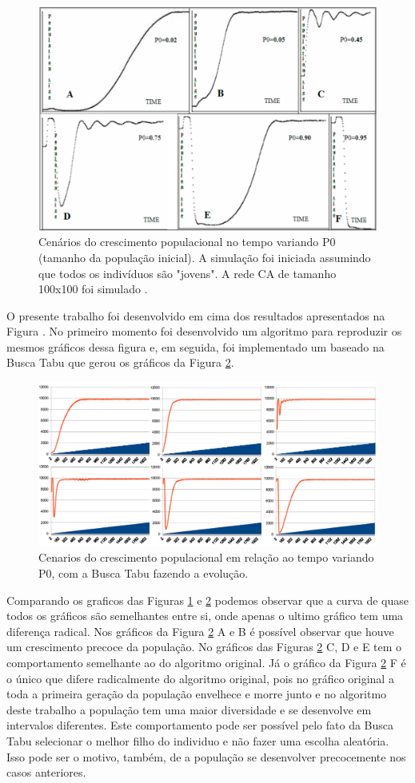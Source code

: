 \documentclass[12pt]{article}
\begin{document}
\begin{figure}[h!]
\centering
\includegraphics[width=.5\textwidth]{imagens/crescimento-populacao-no-tempo}
\caption{Cenários do crescimento populacional no tempo variando P0 (tamanho 
da população inicial). A simulação foi iniciada assumindo que todos os 
indivíduos são "jovens". A rede CA de tamanho 100x100 foi simulado 
\cite{dzwinel:04}.}
\label{fig:crescimento-populacao-no-tempo}
\end{figure}

O presente trabalho foi desenvolvido em cima dos resultados apresentados na
Figura \cite{dzwinel:04}. No primeiro momento foi desenvolvido um algoritmo
para reproduzir os mesmos gráficos dessa figura e, em seguida, foi
implementado um baseado na Busca Tabu que gerou os gráficos da Figura 
\ref{fig:cenarios}.


\begin{figure}[h!]
\centering
\includegraphics[width=.9\textwidth]{imagens/cenarios}
\caption{Cenarios do crescimento populacional em relação ao tempo variando P0,
com a Busca Tabu fazendo a evolução.}
\label{fig:cenarios}
\end{figure}

Comparando os graficos das Figuras \ref{fig:crescimento-populacao-no-tempo} e
\ref{fig:cenarios} podemos observar que a curva de quase todos os gráficos
são semelhantes entre si, onde apenas o ultimo gráfico tem uma diferença 
radical. Nos gráficos da Figura \ref{fig:cenarios} A e B é possível observar
que houve um crescimento precoce da população. No gráficos das Figuras
\ref{fig:cenarios} C, D e E tem o comportamento semelhante ao do algoritmo
original. Já o gráfico da Figura \ref{fig:cenarios} F é o único que difere
radicalmente do algoritmo original, pois no gráfico original a toda a primeira
geração da população envelhece e morre junto e no algoritmo deste trabalho a
população tem uma maior diversidade e se desenvolve em intervalos diferentes.
Este comportamento pode ser possível pelo fato da Busca Tabu selecionar o
melhor filho do individuo e não fazer uma escolha aleatória. Isso pode ser
o motivo, também, de a população se desenvolver precocemente nos casos
anteriores.
\end{document}
